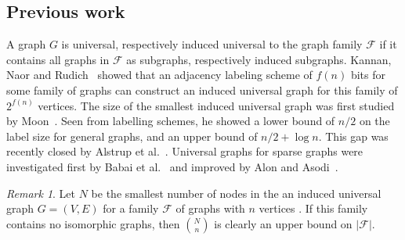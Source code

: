 \documentclass{article}
\theoremstyle{remark}
\newtheorem{remark}{Remark}
\begin{document}
\subsection{Previous work}
A  graph  $G$ is universal, respectively induced universal to the graph family $\mathcal{F}$ if it contains all graphs in  $\mathcal{F}$  as subgraphs, respectively induced subgraphs.
Kannan, Naor and Rudich~\cite{} showed that an adjacency labeling scheme of $f(n)$ bits  for some family of graphs  can construct an induced universal graph for this family of $2^{f(n)}$ vertices.
The size of the smallest induced universal graph was first studied by  Moon~\cite{moon1965minimal}. Seen from labelling schemes, he showed a lower bound of $n/2$ on the label size for general graphs, and an upper bound of  $n/2+ \log n$. This gap was recently closed by Alstrup et al.~\cite{alstrup2014adjacency}.
Universal graphs for sparse graphs were investigated first by Babai et al.~\cite{babai1982graphs} and improved by Alon and Asodi~\cite{Alon2002universal}. 
\begin{remark}
Let $N$ be the smallest number of nodes in the an induced universal graph $G=(V,E)$ for a family $\mathcal{F}$ of graphs with $n$ vertices .
If this family contains no isomorphic graphs, then ${N}\choose{n}$ is clearly an upper bound on $\vert \mathcal{F} \vert$.
\end{remark}
%
\end{document}
